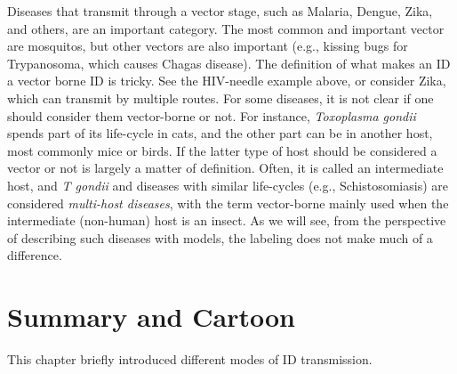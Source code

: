 \documentclass[]{book}
\theoremstyle{definition}
\theoremstyle{definition}
\theoremstyle{definition}
\theoremstyle{remark}
\begin{document}
Diseases that transmit through a vector stage, such as Malaria, Dengue,
Zika, and others, are an important category. The most common and
important vector are mosquitos, but other vectors are also important
(e.g., kissing bugs for Trypanosoma, which causes Chagas disease). The
definition of what makes an ID a vector borne ID is tricky. See the
HIV-needle example above, or consider Zika, which can transmit by
multiple routes. For some diseases, it is not clear if one should
consider them vector-borne or not. For instance, \emph{Toxoplasma
gondii} spends part of its life-cycle in cats, and the other part can be
in another host, most commonly mice or birds. If the latter type of host
should be considered a vector or not is largely a matter of definition.
Often, it is called an intermediate host, and \emph{T gondii} and
diseases with similar life-cycles (e.g., Schistosomiasis) are considered
\emph{multi-host diseases}, with the term vector-borne mainly used when
the intermediate (non-human) host is an insect. As we will see, from the
perspective of describing such diseases with models, the labeling does
not make much of a difference.

\section{Summary and Cartoon}\label{summary-and-cartoon-4}

This chapter briefly introduced different modes of ID transmission.
\end{document}
